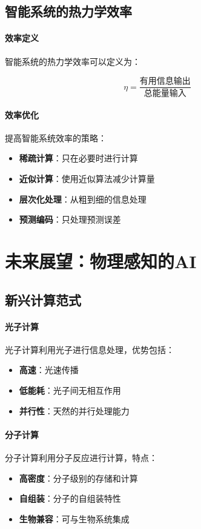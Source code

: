 \subsection{智能系统的热力学效率}

\paragraph{效率定义}
智能系统的热力学效率可以定义为：

$$\eta = \frac{\text{有用信息输出}}{\text{总能量输入}}$$

\paragraph{效率优化}
提高智能系统效率的策略：
\begin{itemize}
\item \textbf{稀疏计算}：只在必要时进行计算
\item \textbf{近似计算}：使用近似算法减少计算量
\item \textbf{层次化处理}：从粗到细的信息处理
\item \textbf{预测编码}：只处理预测误差
\end{itemize}

\section{未来展望：物理感知的AI}

\subsection{新兴计算范式}

\paragraph{光子计算}
光子计算利用光子进行信息处理，优势包括：
\begin{itemize}
\item \textbf{高速}：光速传播
\item \textbf{低能耗}：光子间无相互作用
\item \textbf{并行性}：天然的并行处理能力
\end{itemize}

\paragraph{分子计算}
分子计算利用分子反应进行计算，特点：
\begin{itemize}
\item \textbf{高密度}：分子级别的存储和计算
\item \textbf{自组装}：分子的自组装特性
\item \textbf{生物兼容}：可与生物系统集成
\end{itemize}

